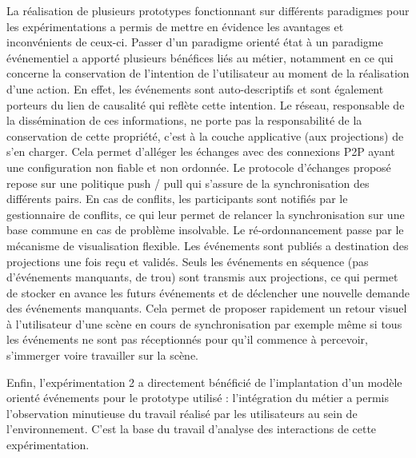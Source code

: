 La réalisation de plusieurs prototypes fonctionnant sur différents 
paradigmes pour les expérimentations a permis de mettre en évidence les 
avantages et inconvénients de ceux-ci.
Passer d'un paradigme orienté état à un paradigme événementiel a apporté
plusieurs bénéfices liés au métier, notamment en ce qui concerne la conservation 
de l'intention de l'utilisateur au moment de la réalisation d'une action. En effet, les 
événements sont auto-descriptifs et sont également porteurs du lien de causalité 
qui reflète cette intention. Le réseau, responsable de la dissémination de ces 
informations, ne porte pas la responsabilité de la conservation de cette propriété, 
c'est à la couche applicative (aux projections) de s'en charger. 
Cela permet d'alléger les échanges 
avec des connexions \gls{P2P} ayant une configuration non fiable et non 
ordonnée. Le protocole d'échanges proposé repose sur une politique push / pull qui 
s'assure de la synchronisation des différents pairs. En cas de conflits, les 
participants sont notifiés par le gestionnaire de conflits, ce qui leur permet de 
relancer la synchronisation sur une base commune en cas de problème insolvable. 
Le ré-ordonnancement passe par le mécanisme de visualisation flexible. Les 
événements sont publiés a destination des projections une fois reçu et validés. 
Seuls les événements en séquence (pas d'événements manquants, de \og 
trou\fg{}) sont transmis aux projections, ce qui permet de stocker en avance les futurs 
événements et de déclencher une nouvelle demande des événements manquants. 
Cela permet de proposer rapidement un retour visuel à l'utilisateur d'une scène en 
cours de synchronisation par exemple même si tous les événements ne sont pas 
réceptionnés pour qu'il commence à percevoir, s'immerger voire travailler sur la 
scène.

Enfin, l'expérimentation 2 a directement bénéficié de l'implantation d'un modèle 
orienté événements pour le prototype utilisé : l'intégration du métier a permis 
l'observation minutieuse du travail réalisé par les utilisateurs au sein de 
l'environnement. C'est la base du travail d'analyse des interactions de cette 
expérimentation.

